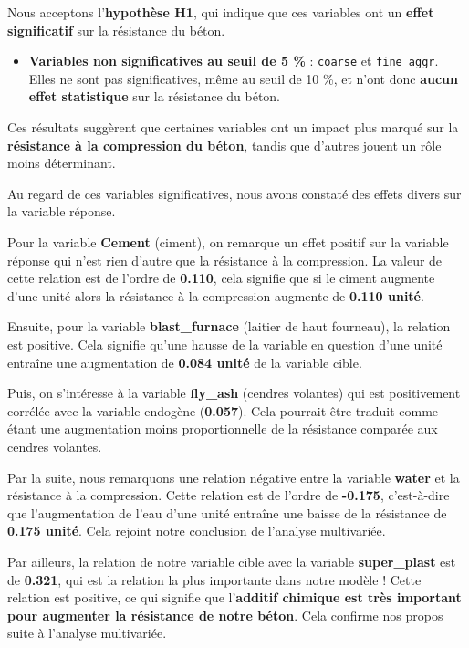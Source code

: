 \documentclass[
  12pt,
]{article}
\providecommand{\tightlist}{%
  \setlength{\itemsep}{0pt}\setlength{\parskip}{0pt}}
\begin{document}
Nous acceptons l'\textbf{hypothèse H1}, qui indique que ces variables
ont un \textbf{effet significatif} sur la résistance du béton.

\begin{itemize}
\tightlist
\item
  \textbf{Variables non significatives au seuil de 5 \%} :
  \texttt{coarse} et \texttt{fine\_aggr}. Elles ne sont pas
  significatives, même au seuil de 10 \%, et n'ont donc \textbf{aucun
  effet statistique} sur la résistance du béton.
\end{itemize}

Ces résultats suggèrent que certaines variables ont un impact plus
marqué sur la \textbf{résistance à la compression du béton}, tandis que
d'autres jouent un rôle moins déterminant.

Au regard de ces variables significatives, nous avons constaté des
effets divers sur la variable réponse.

Pour la variable \textbf{Cement} (ciment), on remarque un effet positif
sur la variable réponse qui n'est rien d'autre que la résistance à la
compression. La valeur de cette relation est de l'ordre de
\textbf{0.110}, cela signifie que si le ciment augmente d'une unité
alors la résistance à la compression augmente de \textbf{0.110 unité}.

Ensuite, pour la variable \textbf{blast\_furnace} (laitier de haut
fourneau), la relation est positive. Cela signifie qu'une hausse de la
variable en question d'une unité entraîne une augmentation de
\textbf{0.084 unité} de la variable cible.

Puis, on s'intéresse à la variable \textbf{fly\_ash} (cendres volantes)
qui est positivement corrélée avec la variable endogène
(\textbf{0.057}). Cela pourrait être traduit comme étant une
augmentation moins proportionnelle de la résistance comparée aux cendres
volantes.

Par la suite, nous remarquons une relation négative entre la variable
\textbf{water} et la résistance à la compression. Cette relation est de
l'ordre de \textbf{-0.175}, c'est-à-dire que l'augmentation de l'eau
d'une unité entraîne une baisse de la résistance de \textbf{0.175
unité}. Cela rejoint notre conclusion de l'analyse multivariée.

Par ailleurs, la relation de notre variable cible avec la variable
\textbf{super\_plast} est de \textbf{0.321}, qui est la relation la plus
importante dans notre modèle ! Cette relation est positive, ce qui
signifie que l'\textbf{additif chimique est très important pour
augmenter la résistance de notre béton}. Cela confirme nos propos suite
à l'analyse multivariée.
\end{document}

